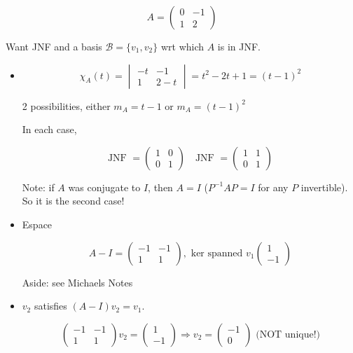 \documentclass[a4paper]{article}
\begin{document}
\begin{eg}
	\[ A = \begin{pmatrix}
	0 & -1 \\
	1 & 2
	\end{pmatrix} 
	\]
	
	Want JNF and a basis $ \mathcal{B} = \{ v_{1},v_{2} \} $ wrt which $ A $ is in JNF.
	
	\begin{itemize}
		\item \[ \chi_{A}(t) = \begin{vmatrix}
		-t & -1 \\
		1 & 2 - t
		\end{vmatrix} = t^{2} - 2t + 1 = (t - 1)^{2} \]
		
		2 possibilities, either $ m_{A} = t-1 $ or $ m_{A} = (t - 1)^{2} $
		
		In each case,
		
		\[ \text{JNF } = \begin{pmatrix}
		1 & 0 \\
		0 & 1
		\end{pmatrix}
		\quad 
		\text{JNF } = \begin{pmatrix}
		1 & 1 \\
		0 & 1
		\end{pmatrix} \]
		
		Note: if $ A $ was conjugate to $ I $, then $ A = I $ ($ P^{-1} A P = I $ for any $ P $ invertible). So it is the second case!
		
		\item Espace
		
		\[ A - I = \begin{pmatrix}
		-1 & -1 \\
		1 & 1
		\end{pmatrix}, \text{ ker spanned } v_{1} \begin{pmatrix}
		1 \\
		-1
		\end{pmatrix} \]
		
		Aside: see Michaels Notes
		
		\item $ v_{2} $ satisfies $ ( A - I)v_{2} = v_{1} $. 
		
		\[ \begin{pmatrix}
		-1 & -1 \\
		1 & 1
		\end{pmatrix} v_{2} = \begin{pmatrix}
		1\\
		-1
		\end{pmatrix} \Rightarrow v_{2} = \begin{pmatrix}
		-1\\
		0
		\end{pmatrix} \text{ (NOT unique!)} \]
		

\end{itemize}
\end{eg}
\end{document}
